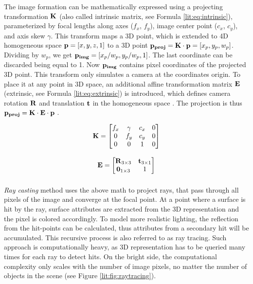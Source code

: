 The image formation can be mathematically expressed using a projecting transformation $\bm{\mathrm{K}}$ (also called intrinsic matrix, see Formula \ref{lit:eq:intrinsic}), parameterized by focal lengths along axes ($f_x$, $f_y$), image center point ($c_x$, $c_y$), and axis skew $\gamma$. This transform maps a 3D point, which is extended to 4D homogeneous space $\bm{\mathrm{p}} = [x, y, z, 1]$ to a 3D point $\bm{\mathrm{p_{proj}}} = \bm{\mathrm{K}} \cdot \bm{\mathrm{p}} = [x_p, y_p, w_p]$. Dividing by $w_p$, we get $\bm{\mathrm{p_{img}}} = [x_p/w_p, y_p/w_p, 1]$. The last coordinate can be discarded being equal to 1. Now $\bm{\mathrm{p_{img}}}$ contains pixel coordinates of the projected 3D point. This transform only simulates a camera at the coordinates origin. To place it at any point in 3D space, an additional affine transformation matrix $\bm{\mathrm{E}}$ (extrinsic, see Formula \ref{lit:eq:extrinsic}) is introduced, which defines camera rotation $\bm{\mathrm{R}}$ and translation $\bm{\mathrm{t}}$ in the homogeneous space \cite{survey:advances-nn22}. The projection is thus $\bm{\mathrm{p_{proj}}} = \bm{\mathrm{K}} \cdot \bm{\mathrm{E}} \cdot \bm{\mathrm{p}}$ .

\begin{multicols}{2}
	\setlength\abovedisplayskip{0pt}
	\noindent
	\begin{equation}
		\bm{\mathrm{K}} = \begin{bmatrix} 
			f_x & \gamma & c_x & 0 \\
			0   & f_y    & c_y & 0 \\
			0   & 0      & 1   & 0 \\
		\end{bmatrix}
		\label{lit:eq:intrinsic}
	\end{equation}
	\begin{equation}
		\vphantom{\begin{bmatrix} a \\ b \\ c \end{bmatrix}}
		\bmr{E} = \begin{bmatrix} 
			\bmr{R}_{3 \times 3} & \bmr{t}_{3 \times 1} \\
			\bmr{0}_{1 \times 3} & 1 \\
		\end{bmatrix}
		\label{lit:eq:extrinsic}
	\end{equation}
	\setlength\belowdisplayskip{0pt} 
\end{multicols} 

\textit{Ray casting} method uses the above math to project rays, that pass through all pixels of the image and converge at the focal point. At a point where a surface is hit by the ray, surface attributes are extracted from the 3D representation and the pixel is colored accordingly. To model more realistic lighting, the reflection from the hit-points can be calculated, thus attributes from a secondary hit will be accumulated. This recursive process is also referred to as ray tracing. Such approach is computationally heavy, as 3D representation has to be queried many times for each ray to detect hits. On the bright side, the computational complexity only scales with the number of image pixels, no matter the number of objects in the scene (see Figure \ref{lit:fig:raytracing}).

